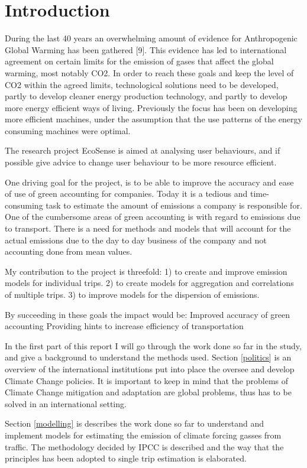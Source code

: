 \section{Introduction}
During the last 40 years an overwhelming amount of evidence for Anthropogenic Global Warming has been gathered [9]. This evidence has led to international agreement on certain limits for the emission of gases that affect the global warming, most notably CO2. In order to reach these goals and keep the level of CO2 within the agreed limits, technological solutions need to be developed, partly to develop cleaner energy production technology, and partly to develop more energy efficient ways of living. Previously the focus has been on developing more efficient machines, under the assumption that the use patterns of the energy consuming machines were optimal.

The research project EcoSense is aimed at analysing user behaviours, and if possible give advice to change user behaviour to be more resource efficient.

One driving goal for the project, is to be able to improve the accuracy and ease of use of green accounting for companies. Today it is a tedious and time-consuming task to estimate the amount of emissions a company is responsible for. One of the cumbersome areas of green accounting is with regard to emissions due to transport. There is a need for methods and models that will account for the actual emissions due to the day to day business of the company and not accounting done from mean values.

My contribution to the project is threefold:
	1) to create and improve emission models for individual trips.
	2) to create models for aggregation and correlations of multiple trips.
	3) to improve models for the dispersion of emissions.

By succeeding in these goals the impact would be:
	Improved accuracy of green accounting
	Providing hints to increase efficiency of transportation
	
In the first part of this report I will go through the work done so far in the study, and give a background to understand the methods used. Section \ref{politics} is an overview of the international institutions put into place the oversee and develop Climate Change policies. It is important to keep in mind that the problems of Climate Change mitigation and adaptation are global problems, thus has to be solved in an international setting.

Section \ref{modelling} is describes the work done so far to understand and implement models for estimating the emission of climate forcing gasses from traffic. The methodology decided by IPCC is described and the way that the principles has been adopted to single trip estimation is elaborated.

